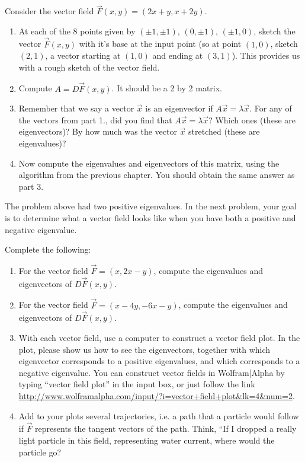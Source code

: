 \begin{problem}
Consider the vector field $\vec F(x,y) = (2x+y, x+2y)$. 
\begin{enumerate}
 \item At each of the 8 points given by $(\pm 1, \pm 1)$, $(0, \pm 1)$, $(\pm 1, 0)$, sketch the vector $\vec F(x,y)$ with it's base at the input point (so at point $(1,0)$, sketch $(2,1)$, a vector starting at $(1,0)$ and ending at $(3,1)$).  This provides us with a rough sketch of the vector field.
 \item Compute $A=D\vec F(x,y)$. It should be a 2 by 2 matrix. 
 \item Remember that we say a vector $\vec x$ is an eigenvector if $A\vec x = \lambda \vec x$.  For any of the vectors from part 1., did you find that $A\vec x = \lambda \vec x$?  Which ones (these are eigenvectors)?  By how much was the vector $\vec x$ stretched (these are eigenvalues)? 
 \item Now compute the eigenvalues and eigenvectors of this matrix, using the algorithm from the previous chapter.  You should obtain the same answer as part 3.
\end{enumerate}
\end{problem}

The problem above had two positive eigenvalues. In the next problem, your goal is to determine what a vector field looks like when you have both a positive and negative eigenvalue.

\begin{problem}
Complete the following:
\begin{enumerate}
 \item For the vector field $\vec F = (x, 2x-y)$, compute the eigenvalues and eigenvectors of $D\vec F(x,y)$. 
 \item For the vector field $\vec F = (x-4y, -6x-y)$, compute the eigenvalues and eigenvectors of $D\vec F(x,y)$. 
 \item With each vector field, use a computer to construct a vector field plot.  In the plot, please show us how to see the eigenvectors, together with which eigenvector corresponds to a positive eigenvalues, and which corresponds to a negative eigenvalue. You can construct vector fields in Wolfram|Alpha by typing ``vector field plot'' in the input box, or just  follow the link \url{http://www.wolframalpha.com/input/?i=vector+field+plot&lk=4&num=2}.
 \item Add to your plots several trajectories, i.e. a path that a particle would follow if $\vec F$ represents the tangent vectors of the path.  Think, ``If I dropped a really light particle in this field, representing water current, where would the particle go? 
\end{enumerate}
\end{problem}

